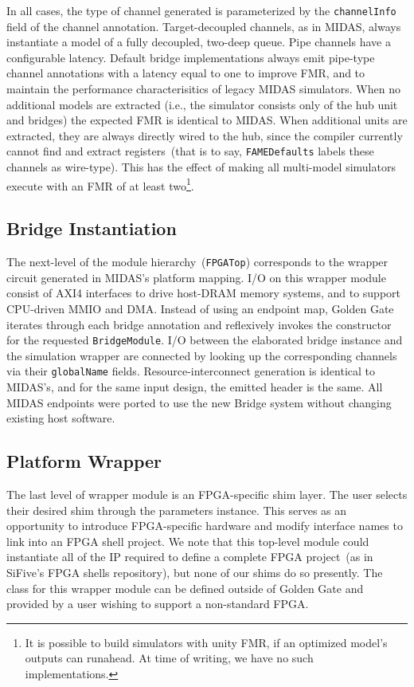 In all cases, the type of channel generated is parameterized by the
\texttt{channelInfo} field of the channel annotation. Target-decoupled channels, as in
MIDAS, always instantiate a model of a fully decoupled, two-deep queue. Pipe
channels have a configurable latency. Default bridge implementations always
emit pipe-type channel annotations with a latency equal to one to improve FMR, and to maintain the
performance characterisitics of legacy MIDAS simulators. When no additional
models are extracted (i.e., the simulator consists only of the hub unit and
bridges) the expected FMR is identical to MIDAS.
When additional units are extracted, they are always directly wired to the
hub, since the compiler currently cannot find and extract registers~(that is to
say, \texttt{FAMEDefaults} labels these channels as wire-type). This has
the effect of making all multi-model simulators execute with an FMR of at least two\footnote{It is possible to build
simulators with unity FMR, if an optimized model's outputs can runahead. At time
of writing, we have no such implementations.}.

\subsection{Bridge Instantiation}
The next-level of the module hierarchy~(\texttt{FPGATop}) corresponds to the wrapper
circuit generated in MIDAS's platform mapping. I/O on this wrapper module consist of AXI4 interfaces
to drive host-DRAM memory systems, and to support CPU-driven MMIO and DMA.
Instead of using an endpoint map, Golden Gate iterates through each bridge
annotation and reflexively invokes the constructor for the requested
\texttt{BridgeModule}. I/O between the elaborated
bridge instance and the simulation wrapper are connected by looking up the
corresponding channels via their \texttt{globalName} fields.
Resource-interconnect generation is identical to MIDAS's, and for the same
input design, the emitted header is the same. All MIDAS endpoints were ported
to use the new Bridge system without changing existing host software.

\subsection{Platform Wrapper}
The last level of wrapper module is an FPGA-specific shim layer. The user
selects their desired shim through the parameters instance. This serves as an
opportunity to introduce FPGA-specific hardware and modify interface names to
link into an FPGA shell project. We note that this top-level module could
instantiate all of the IP required to define a complete FPGA project~(as in
SiFive's FPGA shells repository), but none of our shims do so presently. The
class for this wrapper module can be defined outside of Golden Gate and
provided by a user wishing to support a non-standard FPGA.

